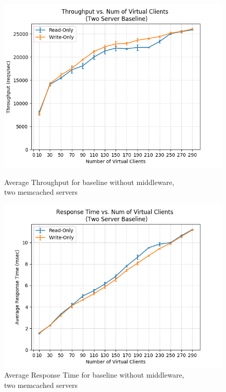 \documentclass[11pt,a4paper]{article}
\begin{document}
\begin{figure}[H]
	\captionsetup{font=scriptsize,labelfont=scriptsize,justification=centering}
	\centering
	\begin{minipage}{0.5\textwidth}
		\centering
		\includegraphics[scale=0.525]{images/2b_two_mc_tps.png}
		\caption{Average Throughput for baseline without middleware, \\ two memcached servers}
		\label{tps_2_mc_baseline}
	\end{minipage}\hfill
	\begin{minipage}{0.5\textwidth}
		\centering
		\includegraphics[scale=0.525]{images/2b_two_mc_rt.png}
		\caption{Average Response Time for baseline without middleware, \\ two memcached servers}
	\end{minipage}
\end{figure}
\end{document}
